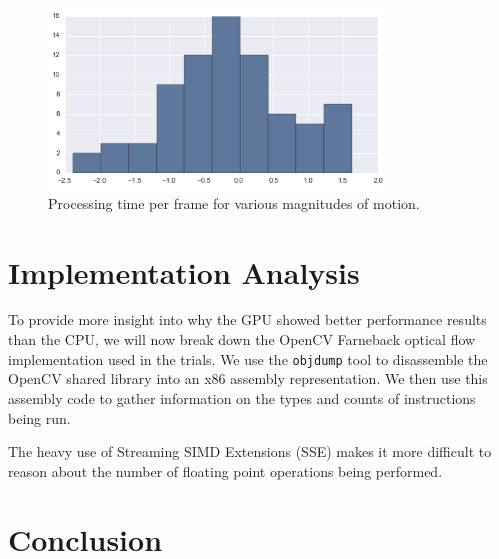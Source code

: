\documentclass{article}
\begin{document}
\begin{figure}[H]
  \centering
    \includegraphics[width=0.8\textwidth]{test_flow.png}
  \caption{Processing time per frame for various magnitudes of motion.}
\end{figure}

\section{Implementation Analysis}
To provide more insight into why the GPU showed better performance results than
the CPU, we will now break down the OpenCV Farneback optical flow implementation
used in the trials. We use the \texttt{objdump} tool to disassemble the OpenCV
shared library into an x86 assembly representation. We then use this assembly
code to gather information on the types and counts of instructions being run.

The heavy use of Streaming SIMD Extensions (SSE) makes it more difficult to
reason about the number of floating point operations being performed.

\section{Conclusion}
\end{document}
